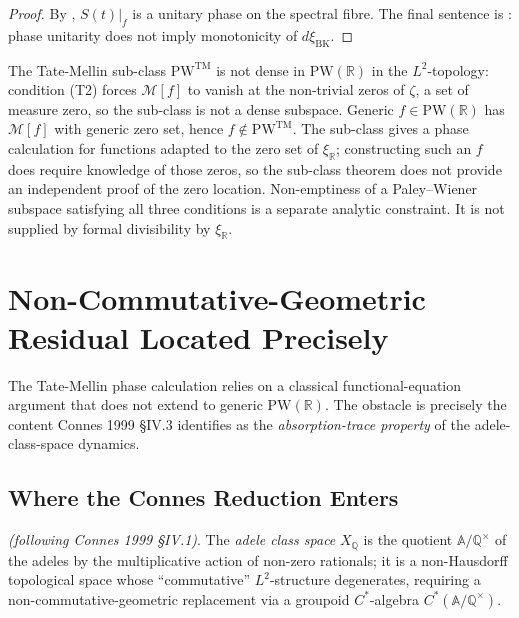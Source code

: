 \begin{proof}
By , \(S(t)|_{f}\) is a unitary
phase on the spectral fibre. The final sentence is
: phase unitarity does not
imply monotonicity of \(d\xi_{\mathrm{BK}}\).
\end{proof}

\begin{remark}
\label{v4-arith:w7-j:rem:TM-density}
The Tate-Mellin sub-class \(\mathrm{PW}^{\mathrm{TM}}\) is not dense
in \(\mathrm{PW}(\mathbb{R})\) in the \(L^2\)-topology: condition (T2)
forces \(\mathcal{M}[f]\) to vanish at the non-trivial zeros of
\(\zeta\), a set of measure zero, so the sub-class is not a dense
subspace. Generic \(f\in\mathrm{PW}(\mathbb{R})\) has
\(\mathcal{M}[f]\) with generic zero set, hence \(f\notin
\mathrm{PW}^{\mathrm{TM}}\). The sub-class gives a phase calculation
for functions adapted to the zero set of \(\xi_{\mathbb{R}}\);
constructing such an \(f\) does require knowledge of those zeros, so
the sub-class theorem does not provide an independent proof of the
zero location.
Non-emptiness of a Paley--Wiener subspace satisfying all three
conditions is a separate analytic constraint. It is not supplied by
formal divisibility by \(\xi_{\mathbb R}\).
\end{remark}

\section{Non-Commutative-Geometric Residual Located Precisely}
\label{v4-arith:w7-j:nc-residual}

The Tate-Mellin phase calculation relies on a classical
functional-equation argument that does not extend to generic
\(\mathrm{PW}(\mathbb{R})\). The obstacle is precisely the content
Connes 1999 \S IV.3 identifies as the \emph{absorption-trace
property} of the adele-class-space dynamics.

\subsection{Where the Connes Reduction Enters}
\label{v4-arith:w7-j:connes-reduction}

\begin{definition}
\label{v4-arith:w7-j:def:connes-ac-space}
\ClaimStatusDefinitional \emph{(following Connes 1999 \S IV.1)}. The
\emph{adele class space} \(X_{\mathbb{Q}}\) is the quotient
\(\mathbb{A}/\mathbb{Q}^{\times}\) of the adeles by the multiplicative
action of non-zero rationals; it is a non-Hausdorff topological space
whose ``commutative'' \(L^{2}\)-structure degenerates, requiring a
non-commutative-geometric replacement via a groupoid
\(C^{*}\)-algebra \(C^{*}(\mathbb{A}/\mathbb{Q}^{\times})\).
\end{definition}

